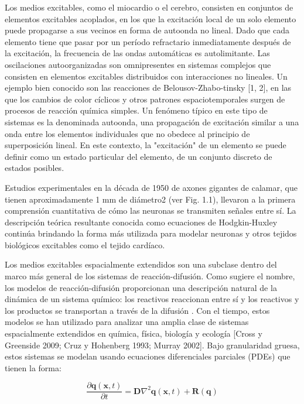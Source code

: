Los medios excitables, como el miocardio o el cerebro, consisten en conjuntos de elementos excitables acoplados, en los que la excitación local de un solo elemento puede propagarse a sus vecinos en forma de autoonda no lineal. Dado que cada elemento tiene que pasar por un período refractario inmediatamente después de la excitación, la frecuencia de las ondas automáticas es autolimitante. Las oscilaciones autoorganizadas son omnipresentes en sistemas complejos que consisten en elementos excitables distribuidos con interacciones no lineales. Un ejemplo bien conocido son las reacciones de Belousov-Zhabo-tinsky [1, 2], en las que los cambios de color cíclicos y otros patrones espaciotemporales surgen de procesos de reacción química simples. Un fenómeno típico en este tipo de sistemas es la denominada autoonda, una propagación de excitación similar a una onda entre los elementos individuales que no obedece al principio de superposición lineal. En este contexto, la "excitación" de un elemento se puede definir como un estado particular del elemento, de un conjunto discreto de estados posibles.


Estudios experimentales en la década de 1950 de axones gigantes de calamar, que tienen aproximadamente 1 mm de diámetro2 (ver Fig. 1.1), llevaron a la primera comprensión cuantitativa de cómo las neuronas se transmiten señales entre sí. La descripción teórica resultante conocida como ecuaciones de Hodgkin-Huxley continúa brindando la forma más utilizada para modelar neuronas y otros tejidos biológicos excitables como el tejido cardíaco.





Los medios excitables espacialmente extendidos son una subclase dentro del marco más general de los sistemas de reacción-difusión. Como sugiere el nombre, los modelos de reacción-difusión proporcionan una descripción natural de la dinámica de un sistema químico: los reactivos reaccionan entre sí y los reactivos y los productos se transportan a través de la difusión \cite{sinha_patterns_2019}. Con el tiempo, estos modelos se han utilizado para analizar una amplia clase de sistemas espacialmente extendidos en química, física, biología y ecología [Cross y Greenside 2009; Cruz y Hohenberg 1993; Murray 2002]. Bajo granularidad gruesa, estos sistemas se modelan usando ecuaciones diferenciales parciales (PDEs) que tienen la forma:

\begin{equation}\label{eq:74}
	\frac{\partial \mathbf{q}(\mathbf{x},t)}{\partial{t}} = \bm{D} \nabla^{2} \mathbf{q}(\mathbf{x},t)+\mathbf{R}(\mathbf{q})
\end{equation}



